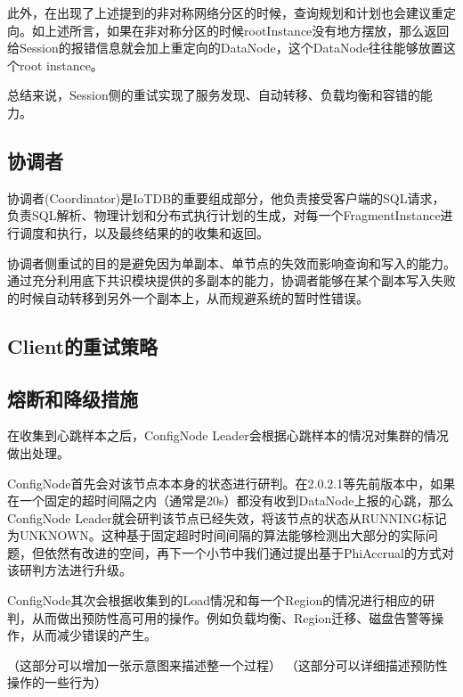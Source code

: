 此外，在出现了上述提到的非对称网络分区的时候，查询规划和计划也会建议重定向。如上述所言，如果在非对称分区的时候rootInstance没有地方摆放，那么返回给Session的报错信息就会加上重定向的DataNode，这个DataNode往往能够放置这个root instance。


总结来说，Session侧的重试实现了服务发现、自动转移、负载均衡和容错的能力。



\subsection{协调者}

协调者(Coordinator)是IoTDB的重要组成部分，他负责接受客户端的SQL请求，负责SQL解析、物理计划和分布式执行计划的生成，对每一个FragmentInstance进行调度和执行，以及最终结果的的收集和返回。

协调者侧重试的目的是避免因为单副本、单节点的失效而影响查询和写入的能力。通过充分利用底下共识模块提供的多副本的能力，协调者能够在某个副本写入失败的时候自动转移到另外一个副本上，从而规避系统的暂时性错误。






\subsection{Client的重试策略}






\subsection{熔断和降级措施}




在收集到心跳样本之后，ConfigNode Leader会根据心跳样本的情况对集群的情况做出处理。

ConfigNode首先会对该节点本本身的状态进行研判。在2.0.2.1等先前版本中，如果在一个固定的超时间隔之内（通常是20s）都没有收到DataNode上报的心跳，那么ConfigNode Leader就会研判该节点已经失效，将该节点的状态从RUNNING标记为UNKNOWN。这种基于固定超时时间间隔的算法能够检测出大部分的实际问题，但依然有改进的空间，再下一个小节中我们通过提出基于PhiAccrual的方式对该研判方法进行升级。

ConfigNode其次会根据收集到的Load情况和每一个Region的情况进行相应的研判，从而做出预防性高可用的操作。例如负载均衡、Region迁移、磁盘告警等操作，从而减少错误的产生。


（这部分可以增加一张示意图来描述整一个过程）
（这部分可以详细描述预防性操作的一些行为）